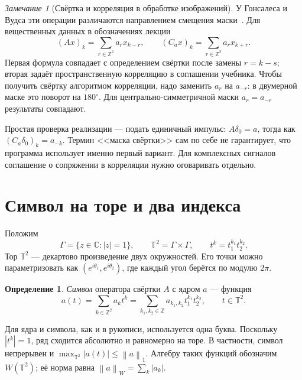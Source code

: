 \documentclass[12pt,a4paper]{article}
\theoremstyle{definition}
\newtheorem{definition}{Определение}
\theoremstyle{remark}
\newtheorem*{remark}{Замечание}
\newcommand{\CC}{\mathbb{C}}
\newcommand{\ZZ}{\mathbb{Z}}
\newcommand{\norm}[1]{\left\lVert #1\right\rVert}
\newcommand{\TT}{\mathbb T}
\begin{document}
\begin{remark}[Свёртка и корреляция в обработке изображений]
У Гонсалеса и Вудса эти операции различаются направлением смещения
маски~\cite[\S\,3.4.2, с.~188--192]{GW2012}. Для вещественных
данных в обозначениях лекции
\[
  (Ax)_k=\sum_{r\in\ZZ^2}a_rx_{k-r},\qquad
  (C_ax)_k=\sum_{r\in\ZZ^2}a_rx_{k+r}.
\]
Первая формула совпадает с определением свёртки после замены $r=k-s$;
вторая задаёт пространственную корреляцию в соглашении учебника.
Чтобы получить свёртку алгоритмом корреляции, надо заменить
$a_r$ на $a_{-r}$: в двумерной маске это поворот на $180^\circ$.
Для центрально-симметричной маски $a_r=a_{-r}$ результаты совпадают.

Простая проверка реализации --- подать единичный импульс:
$A\delta_0=a$, тогда как $(C_a\delta_0)_k=a_{-k}$.
Термин <<маска свёртки>> сам по себе не гарантирует, что программа
использует именно первый вариант. Для комплексных сигналов
соглашение о сопряжении в корреляции нужно оговаривать отдельно.
\end{remark}

\section{Символ на торе и два индекса}

Положим
\[
  \Gamma=\{z\in\CC:|z|=1\},\qquad
  \TT^2=\Gamma\times\Gamma,\qquad
  t^k=t_1^{k_1}t_2^{k_2}.
\]
Тор $\TT^2$ --- декартово произведение двух окружностей.
Его точки можно параметризовать как
$(e^{i\theta_1},e^{i\theta_2})$, где каждый угол берётся по модулю $2\pi$.

\begin{definition}
\emph{Символ} оператора свёртки $A$ с ядром $a$ --- функция
\[
  a(t)=\sum_{k\in\ZZ^2}a_kt^k
  =\sum_{k_1,k_2\in\ZZ}a_{k_1,k_2}t_1^{k_1}t_2^{k_2},
  \qquad t\in\TT^2.
\]
\end{definition}

Для ядра и символа, как и в рукописи, используется одна буква.
Поскольку $|t^k|=1$, ряд сходится абсолютно и равномерно
на торе. В частности, символ непрерывен и
$\max_{\TT^2}|a(t)|\leqslant\norm{a}_1$.
Алгебру таких функций обозначим $W(\TT^2)$; её норма равна
$\norm{a}_W=\sum_k|a_k|$.
\end{document}
